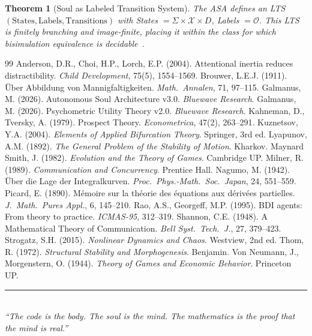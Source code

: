 \documentclass[12pt,a4paper]{article}
\theoremstyle{plain}
\newtheorem{theorem}{Theorem}[section]
\theoremstyle{definition}
\theoremstyle{remark}
\newcommand{\X}{\mathcal{X}}
\begin{document}
\begin{theorem}[Soul as Labeled Transition System]
The ASA defines an LTS $(\text{States}, \text{Labels}, \text{Transitions})$ with States $= \Sigma \times \X \times D$, Labels $= \mathcal{O}$. This LTS is finitely branching and image-finite, placing it within the class for which bisimulation equivalence is decidable~\cite{milner1989}.
\end{theorem}


\begin{thebibliography}{99}
 Anderson, D.R., Choi, H.P., Lorch, E.P. (2004). Attentional inertia reduces distractibility. \textit{Child Development}, 75(5), 1554--1569.
 Brouwer, L.E.J. (1911). \"Uber Abbildung von Mannigfaltigkeiten. \textit{Math.\ Annalen}, 71, 97--115.
 Galmanus, M. (2026). Autonomous Soul Architecture v3.0. \textit{Bluewave Research}.
 Galmanus, M. (2026). Psychometric Utility Theory v2.0. \textit{Bluewave Research}.
 Kahneman, D., Tversky, A. (1979). Prospect Theory. \textit{Econometrica}, 47(2), 263--291.
 Kuznetsov, Y.A. (2004). \textit{Elements of Applied Bifurcation Theory}. Springer, 3rd ed.
 Lyapunov, A.M. (1892). \textit{The General Problem of the Stability of Motion}. Kharkov.
 Maynard Smith, J. (1982). \textit{Evolution and the Theory of Games}. Cambridge UP.
 Milner, R. (1989). \textit{Communication and Concurrency}. Prentice Hall.
 Nagumo, M. (1942). \"Uber die Lage der Integralkurven. \textit{Proc.\ Phys.-Math.\ Soc.\ Japan}, 24, 551--559.
 Picard, E. (1890). M\'emoire sur la th\'eorie des \'equations aux d\'eriv\'ees partielles. \textit{J.\ Math.\ Pures Appl.}, 6, 145--210.
 Rao, A.S., Georgeff, M.P. (1995). BDI agents: From theory to practice. \textit{ICMAS-95}, 312--319.
 Shannon, C.E. (1948). A Mathematical Theory of Communication. \textit{Bell Syst.\ Tech.\ J.}, 27, 379--423.
 Strogatz, S.H. (2015). \textit{Nonlinear Dynamics and Chaos}. Westview, 2nd ed.
 Thom, R. (1972). \textit{Structural Stability and Morphogenesis}. Benjamin.
 Von Neumann, J., Morgenstern, O. (1944). \textit{Theory of Games and Economic Behavior}. Princeton UP.
\end{thebibliography}

\vspace{2em}
\begin{center}
\rule{0.6\textwidth}{0.4pt}\\[1em]
\textit{``The code is the body. The soul is the mind. The mathematics is the proof that the mind is real.''}
\end{center}
\end{document}
